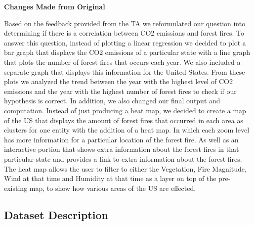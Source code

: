\documentclass[fontsize=11pt]{article}
\begin{document}
\textbf{Changes Made from Original}

Based on the feedback provided from the TA we reformulated our question into 
determining if there is a correlation between CO2 emissions and forest fires. To answer this question, instead of plotting a linear regression we decided to plot a bar graph that displays the CO2 emissions of a particular state with a line graph that plots the number of forest fires that occurs each year. We also included a separate graph that displays this information for the United States. From these plots we analyzed the trend between the year with the highest level of CO2 emissions and the year with the highest number of forest fires to check if our hypothesis is correct. In addition, we also changed our final output and computation. Instead of just producing a heat map, we decided to create a map of the US that displays the amount of forest fires that occurred in each area as clusters for one entity with the addition of a heat map. In which each zoom level has more information for a particular location of the forest fire. As well as an interactive portion that shows extra information about the forest fires in that particular state and provides a link to extra information about the forest fires. The heat map allows the user to filter to either the Vegetation, Fire Magnitude, Wind at that time and Humidity at that time as a layer on top of the pre-existing map, to show how various areas of the US are effected.\\
\pagebreak

\subsection{Dataset Description}
\end{document}
